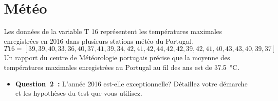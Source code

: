 \vspace{1cm}
\section{Météo}
\vspace{.2cm}

\noindent
Les données de la variable T 16 représentent les températures maximales enregistrées en 2016 dans
plusieurs stations météo du Portugal. \\
$T16 = [39, 39, 40, 33, 36, 40, 37, 41, 39, 34, 42, 41, 42, 44, 42, 42, 39, 42, 41, 40, 43, 43, 40, 39, 37]$ \\
Un rapport du centre de Météorologie portugais précise que la moyenne des températures maximales
enregistrées au Portugal au fil des ans est de \SI{37,5}{\celsius}.

\vspace{.2cm}


\begin{itemize}[label={},itemindent=-2em,leftmargin=2em]
    \item \textbf{Question~2~:} L’année 2016 est-elle exceptionnelle? Détaillez votre démarche et les hypothèses du test
    que vous utilisez.
\end{itemize}
\vspace{.2cm}

